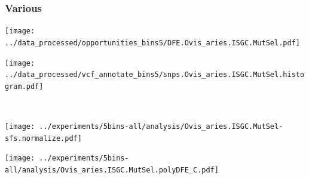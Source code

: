 \subsubsection{Various}

\begin{minipage}{0.49\linewidth}
    \texttt{[image: ../data\_processed/opportunities\_bins5/DFE.Ovis\_aries.ISGC.MutSel.pdf]}
\end{minipage}
\begin{minipage}{0.49\linewidth}
    \texttt{[image: ../data\_processed/vcf\_annotate\_bins5/snps.Ovis\_aries.ISGC.MutSel.histogram.pdf]}
\end{minipage}
\\
\begin{minipage}{0.49\linewidth}
    \texttt{[image: ../experiments/5bins-all/analysis/Ovis\_aries.ISGC.MutSel-sfs.normalize.pdf]}
\end{minipage}
\begin{minipage}{0.4\linewidth}
    \texttt{[image: ../experiments/5bins-all/analysis/Ovis\_aries.ISGC.MutSel.polyDFE\_C.pdf]}
\end{minipage}
